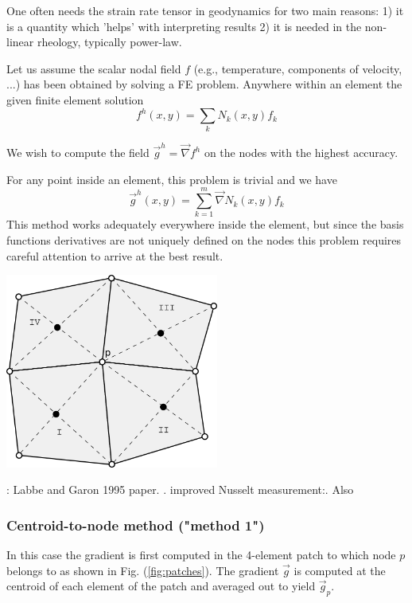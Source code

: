 
One often needs the strain rate tensor in geodynamics for two main reasons:
1) it is a quantity which 'helps' with interpreting results
2) it is needed in the non-linear rheology, typically power-law.

Let us assume the scalar nodal field $f$ (e.g., temperature, 
components of velocity, ...) has been obtained by solving a FE problem.
Anywhere within an element 
the given finite element solution 
\[
f^h(x,y)=\sum_k N_k(x,y) f_k
\]
 
We wish to compute the field $\vec g^h = \vec \nabla f^h$ on the nodes 
with the highest accuracy. 

For any point inside an element, this problem is trivial and we have 
\begin{equation}
\vec g^h(x,y) = \sum_{k=1}^m \vec\nabla N_k (x,y) f_k \label{eq:derr1}
\end{equation}
This method works adequately everywhere inside the element, but 
since the basis functions derivatives
are not uniquely defined on the nodes 
this problem requires careful attention
to arrive at the best result.

\begin{center}
\includegraphics[width=7cm]{images/patch/patch3}
\end{center}

\Literature: Labbe and Garon 1995 paper. \cite{zizh92a,zizh92b}. 
improved Nusselt measurement:\cite{hohr87}. Also \cite{grls87}

\subsubsection{Centroid-to-node method ("method 1")}
In this case the gradient is first computed in the 4-element patch 
to which node $p$ belongs to as shown in Fig. (\ref{fig:patches}).
The gradient $\vec g$ is computed at the centroid of each element of the 
patch and averaged out to yield $\vec g_p$.


